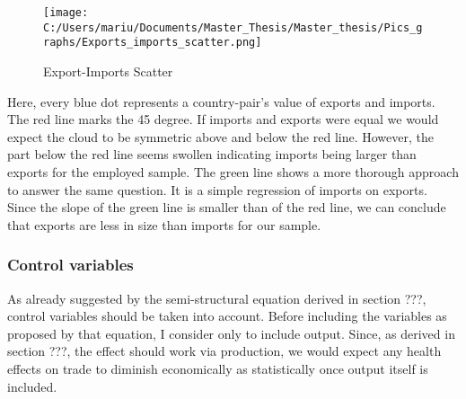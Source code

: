 \documentclass{article}
\begin{document}
\begin{figure}[!ht]
\begin{center}\caption{Export-Imports Scatter \label{Export-Imports Scatter}}
\texttt{[image: C:/Users/mariu/Documents/Master\_Thesis/Master\_thesis/Pics\_graphs/Exports\_imports\_scatter.png]}\\
\end{center}
\end{figure}

Here, every blue dot represents a country-pair's value of exports and imports. The red line marks the 45 degree. If imports and exports were equal we would expect the cloud to be symmetric above and below the red line. However, the part below the red line seems swollen indicating imports being larger than exports for the employed sample. The green line shows a more thorough approach to answer the same question. It is a simple regression of imports on exports. Since the slope of the green line is smaller than of the red line, we can conclude that exports are less in size than imports for our sample. \\


\subsubsection{Control variables}

As already suggested by the semi-structural equation derived in section ???, control variables should be taken into account. Before including the variables as proposed by that equation, I consider only to include output. Since, as derived in section ???, the effect should work via production, we would expect any health effects on trade to diminish economically as statistically once output itself is included. \\  
\end{document}
